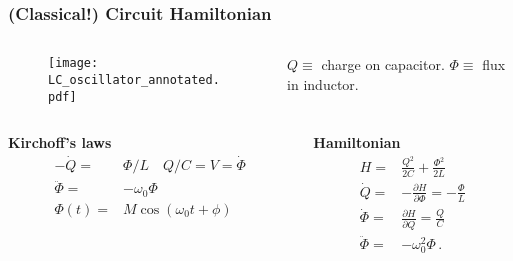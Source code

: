 \begin{frame}
\frametitle{(Classical!) Circuit Hamiltonian}
\begin{columns}
  \begin{column}{0.3\textwidth}
    \begin{figure}
      \texttt{[image: LC\_oscillator\_annotated.pdf]}
    \end{figure}
  \end{column}
  \begin{column}{0.7\textwidth}
    $Q \equiv $ charge on capacitor. $\Phi \equiv$ flux in inductor.
  \end{column}
\end{columns}

\begin{columns}[t]
  \begin{column}{0.4\textwidth}
    \textbf{Kirchoff's laws}
    \begin{align*}
      -\dot{Q} =& \Phi/L \quad Q/C = V = \dot{\Phi} \\
      \ddot{\Phi} =& -\omega_0 \Phi \\
      \Phi(t) =& M \cos(\omega_0 t + \phi) \\
    \end{align*}
  \end{column}
  \begin{column}{0.4\textwidth}
    \textbf{Hamiltonian}
    \begin{align*}
      H =& \frac{Q^2}{2C} + \frac{\Phi^2}{2L} \\
      \dot{Q} =& - \frac{\partial H}{\partial \Phi} = -\frac{\Phi}{L} \\
      \dot{\Phi} =& \frac{\partial H}{\partial Q} = \frac{Q}{C} \\
      \ddot{\Phi} =& - \omega_0^2 \Phi \, .
    \end{align*}
  \end{column}
\end{columns}
 
\end{frame}
